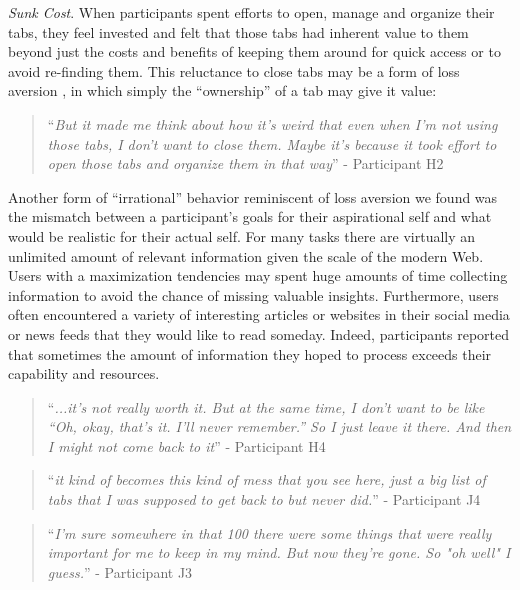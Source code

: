 \emph{Sunk Cost}. When participants spent efforts to open, manage and organize their tabs, they feel invested  and felt that those tabs had inherent value to them beyond just the costs and benefits of keeping them around for quick access or to avoid re-finding them. This reluctance to close tabs may be a form of loss aversion \cite{tversky1991loss}, in which simply the ``ownership'' of a tab may give it value:

\begin{quote}
``\emph{But it made me think about how it's weird that even when I'm not using those tabs, I don't want to close them. Maybe it's because it took effort to open those tabs and organize them in that way}'' - Participant H2
\end{quote}

Another form of ``irrational'' behavior reminiscent of loss aversion we found was the mismatch between a participant's goals for their aspirational self and what would be realistic for their actual self. For many tasks there are virtually an unlimited amount of relevant information given the scale of the modern Web. Users with a maximization tendencies may spent huge amounts of time collecting information to avoid the chance of missing valuable insights. Furthermore, users often encountered a variety of interesting articles or websites in their social media or news feeds that they would like to read someday. Indeed, participants reported that sometimes the amount of information they hoped to process exceeds their capability and resources. 


\begin{quote}
``\emph{...it's not really worth it. But at the same time, I don't want to be like ``Oh, okay, that's it. I'll never remember.'' So I just leave it there. And then I might not come back to it}'' - Participant H4
\end{quote}

\begin{quote}
``\emph{it kind of becomes this kind of mess that you see here, just a big list of tabs that I was supposed to get back to but never did.}'' - Participant J4
\end{quote}




\begin{quote}
``\emph{I'm sure somewhere in that 100 there were some things that were really important for me to keep in my mind. But now they're gone. So "oh well" I guess.}'' - Participant J3
\end{quote}

